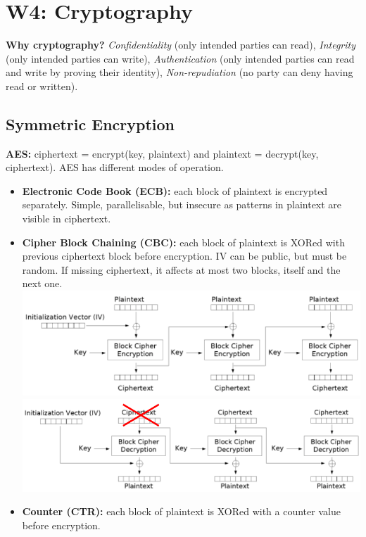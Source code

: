 \section{W4: Cryptography}
\textbf{Why cryptography?} \textit{Confidentiality} (only intended parties can read), \textit{Integrity} (only intended parties can write), \textit{Authentication} (only intended parties can read and write by proving their identity), \textit{Non-repudiation} (no party can deny having read or written).

\subsection{Symmetric Encryption}
\textbf{AES:} ciphertext = encrypt(key, plaintext) and plaintext = decrypt(key, ciphertext). AES has different modes of operation.\\
\begin{itemize}
    \item \textbf{Electronic Code Book (ECB):} each block of plaintext is encrypted separately. Simple, parallelisable, but insecure as patterns in plaintext are visible in ciphertext.
    \item \textbf{Cipher Block Chaining (CBC):} each block of plaintext is XORed with previous ciphertext block before encryption. IV can be public, but must be random. If missing ciphertext, it affects at most two blocks, itself and the next one.
    \includegraphics[width=\linewidth]{figs/cbc-encryption.png}
    \includegraphics[width=\linewidth]{figs/cbc-decryption.png}
    \item \textbf{Counter (CTR):} each block of plaintext is XORed with a counter value before encryption.
\end{itemize}

